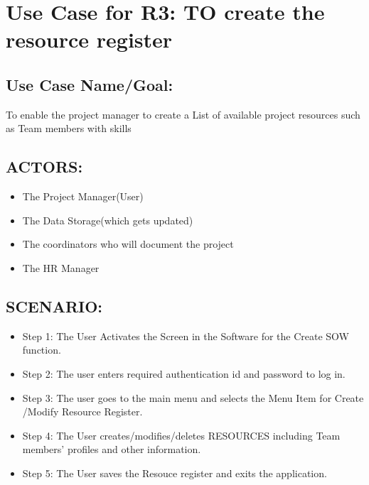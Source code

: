 \documentclass[10pt]{article}
\begin{document}
\section{Use Case for R3: TO create the resource register  }

\subsection{Use Case Name/Goal: }
To enable the project manager to create a List of available project resources such as Team members with skills

\subsection{ACTORS:}
\begin{itemize}
  \item   The Project Manager(User)
  \item  The Data Storage(which gets updated)
 \item The coordinators who will document the project
\item The HR Manager


\end{itemize}
						

\subsection{SCENARIO: }

\begin{itemize}
  \item Step 1: The User Activates the Screen in the Software for the Create SOW function.
  \item Step 2: The user enters required authentication id and password to log in.
  \item Step 3: The user goes to the main menu and selects the Menu Item for Create /Modify Resource Register.
\item  Step 4: The User creates/modifies/deletes RESOURCES including Team members' profiles and other information.
\item Step 5:  The User saves the Resouce register and exits the application.
\end{itemize}
\end{document}
